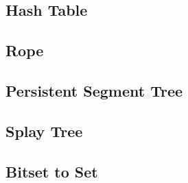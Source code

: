 \documentclass[9pt,landscape,a4paper,twocolumn]{extarticle}
\begin{document}
\subsection{Hash Table}


\subsection{Rope}


% 

% 

% 

% 

\subsection{Persistent Segment Tree}


\subsection{Splay Tree}


\subsection{Bitset to Set}

\end{document}
